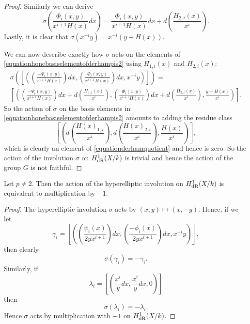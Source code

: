 \begin{proof}
    Similarly we can derive
        \begin{equation*}
        \sigma \left( \frac{\Phi_i(x,y)}{x^{i+1}H(x)} dx \right)  = \frac{\Phi_i(x,y)}{x^{i+1}H(x)} dx + d \left( \frac{H_{2,i}(x)}{x^i} \right).
        \end{equation*}
    Lastly, it is clear that $\sigma(x^{-i}y) = x^{-i}(y+H(x))$.
    
    
    We can now describe exactly how $\sigma$ acts on the elements of \eqref{equationhonebasiselementofderhampis2} using $H_{1,i}(x)$ and $H_{2,i}(x)$:
        \begin{multline*}
        \sigma \left( \left[ \left( \left(\frac{-\Psi_i(x,y)}{x^{i+1}H(x)}\right) dx, \left( \frac{\Phi_i(x,y)}{x^{i+1}H(x)} \right) dx, x^{-i}y \right)\right]\right) = \\
         \left[ \left( \left(\frac{-\Psi_i(x,y)}{x^{i+1}H(x)} \right) dx + d\left(\frac{H_{1,i}(x)}{x^i}\right),  \left( \frac{\Phi_i(x,y)}{x^{i+1}H(x)} \right) dx+ d\left(\frac{H_{2,i}(x)}{x^i} \right), \frac{y+H(x)}{x^i} \right) \right].
        \end{multline*}
    So the action of $\sigma$ on the basis elements in \eqref{equationhonebasiselementofderhampis2} amounts to adding the residue class 
        \[
        \left[ \left( d\left(\frac{H(x)_{1,i}}{x^i}\right), d\left(\frac{H(x)_{2,i}}{x^i}\right), \frac{H(x)}{x^i} \right)\right],
        \]
    which is clearly an element of \eqref{equationderhamquotient} and hence is zero.
    So the action of the involution $\sigma$ on $H_{\text {dR}}^1(X/k)$ is trivial and hence the action of the group $G$ is not faithful.
    \end{proof}

    \begin{cor}
    Let $p \neq 2$.
    Then the action of the hyperelliptic involution on $H_{\text {dR}}^1(X/k)$ is equivalent to multiplication by $-1$.
    \end{cor}
    \begin{proof}
    The hyperelliptic involution $\sigma$ acts by $(x,y) \mapsto (x,-y)$.
    Hence, if we let
        \[
        \gamma_i = \left[ \left( \left( \frac{\psi_i(x)}{2yx^{i+1}}\right) dx, \left(\frac{-\phi_i(x)}{2yx^{i+1}}\right) dx, x^{-i}y\right) \right],
        \]
    then clearly
        \begin{equation*}
        \sigma(\gamma_i) = -\gamma_i.
        \end{equation*}
    Similarly, if 
        \[
        \lambda_i = \left[ \left( \frac{x^i}{y}dx, \frac{x^i}{y}dx, 0 \right) \right]
        \]
    then 
        \[
        \sigma(\lambda_i) = - \lambda_i.
        \]
    Hence $\sigma$ acts by multiplication with $-1$ on $H_{\text {dR}}^1(X/k)$.
    \end{proof}


